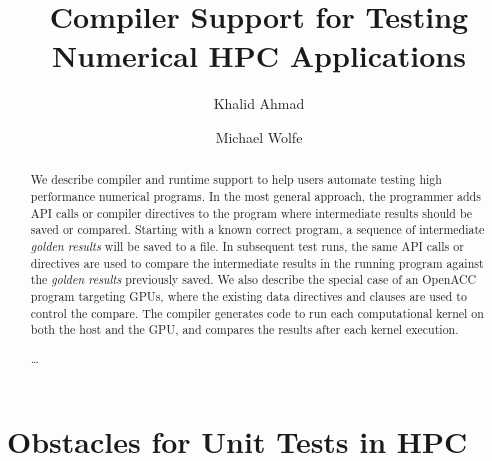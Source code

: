 \documentclass{llncs}
\begin{document}
\title{Compiler Support for Testing Numerical HPC Applications}
%
%
\author{Khalid Ahmad \and Michael Wolfe}
%
%
%

\maketitle              %

\begin{abstract}
We describe compiler and runtime support to help users automate testing high performance numerical programs.
In the most general approach, the programmer adds API calls or compiler directives to the program where intermediate results should be saved or compared.
Starting with a known correct program, a sequence of intermediate \emph{golden results} will be saved to a file.
In subsequent test runs, the same API calls or directives are used to compare the intermediate results in the running program against the \emph{golden results} previously saved.
We also describe the special case of an OpenACC program targeting GPUs, where the existing data directives and clauses are used to control the compare.
The compiler generates code to run each computational kernel on both the host and the GPU, and compares the results after each kernel execution.

\dots
{}
\end{abstract}
%









%


\section{Obstacles for Unit Tests in HPC}
\end{document}
